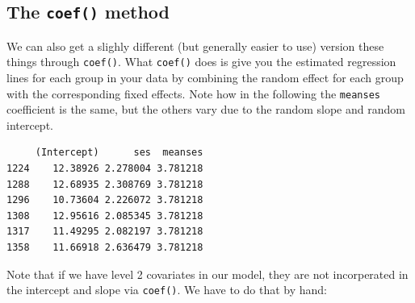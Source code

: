 \documentclass[
  letterpaper,
  DIV=11,
  numbers=noendperiod]{scrreprt}
\newenvironment{Shaded}{\begin{snugshade}}{\end{snugshade}}
\newcommand{\AttributeTok}[1]{\textcolor[rgb]{0.49,0.56,0.16}{#1}}
\newcommand{\ConstantTok}[1]{\textcolor[rgb]{0.53,0.00,0.00}{#1}}
\newcommand{\FunctionTok}[1]{\textcolor[rgb]{0.02,0.16,0.49}{#1}}
\newcommand{\NormalTok}[1]{\textcolor[rgb]{0.00,0.44,0.13}{#1}}
\newcommand{\OtherTok}[1]{\textcolor[rgb]{0.00,0.44,0.13}{#1}}
\newcommand{\SpecialCharTok}[1]{\textcolor[rgb]{0.25,0.44,0.63}{#1}}
\newcommand{\StringTok}[1]{\textcolor[rgb]{0.25,0.44,0.63}{#1}}
\begin{document}
\begin{Shaded}
\end{Shaded}

\hypertarget{the-coef-method}{%
\subsection{\texorpdfstring{The \texttt{coef()}
method}{The coef() method}}\label{the-coef-method}}

We can also get a slighly different (but generally easier to use)
version these things through \texttt{coef()}. What \texttt{coef()} does
is give you the estimated regression lines for each group in your data
by combining the random effect for each group with the corresponding
fixed effects. Note how in the following the \texttt{meanses}
coefficient is the same, but the others vary due to the random slope and
random intercept.

\begin{Shaded}
\end{Shaded}

\begin{verbatim}
     (Intercept)      ses  meanses
1224    12.38926 2.278004 3.781218
1288    12.68935 2.308769 3.781218
1296    10.73604 2.226072 3.781218
1308    12.95616 2.085345 3.781218
1317    11.49295 2.082197 3.781218
1358    11.66918 2.636479 3.781218
\end{verbatim}

Note that if we have level 2 covariates in our model, they are not
incorperated in the intercept and slope via \texttt{coef()}. We have to
do that by hand:

\begin{Shaded}
\end{Shaded}
\end{document}
